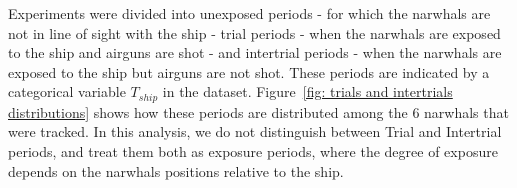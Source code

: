 \documentclass[11pt]{article}
\newcommand {\1}{\mathbb{1}}
\begin{document}
Experiments were divided into unexposed periods - for which the narwhals are not in line of sight with the ship - trial periods - when the narwhals are exposed to the ship and airguns are shot - and intertrial periods - when the narwhals are exposed to the ship but airguns are not shot. These periods are indicated by a categorical variable $T_{ship}$ in the dataset. Figure~\ref{fig: trials and intertrials distributions} shows how these periods are distributed among the $6$ narwhals that were tracked. In this analysis, we do not distinguish between Trial and Intertrial periods, and treat them both as exposure periods, where the degree of exposure depends on the narwhals positions relative to the ship.

\end{document}

